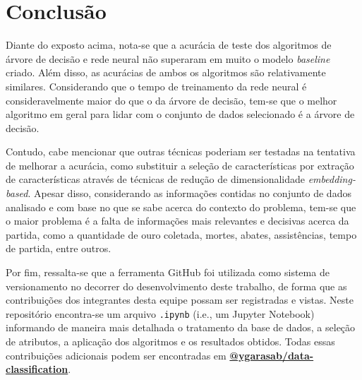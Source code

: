\documentclass[12pt]{article}
\begin{document}
\section{Conclusão}\label{sec:conclusao}
Diante do exposto acima, nota-se que a acurácia de teste dos algoritmos de árvore de decisão e rede neural não superaram em muito o modelo \textit{baseline} criado. Além disso, as acurácias de ambos os algoritmos são relativamente similares.  Considerando que o tempo de treinamento da rede neural é consideravelmente maior do que o da árvore de decisão, tem-se que o melhor algoritmo em geral para lidar com o conjunto de dados selecionado é a árvore de decisão. 

Contudo, cabe mencionar que outras técnicas poderiam ser testadas na tentativa de melhorar a acurácia, como substituir a seleção de características por extração de características através de técnicas de redução de dimensionalidade \textit{embedding-based}. Apesar disso, considerando as informações contidas no conjunto de dados analisado e com base no que se sabe acerca do contexto do problema, tem-se que o maior problema é a falta de informações mais relevantes e decisivas acerca da partida, como a quantidade de ouro coletada, mortes, abates, assistências, tempo de partida, entre outros. 

Por fim, ressalta-se que a ferramenta GitHub foi utilizada como sistema de versionamento no decorrer do desenvolvimento deste trabalho, de forma que as contribuições dos integrantes desta equipe possam ser registradas e vistas. Neste repositório encontra-se um arquivo \texttt{.ipynb} (i.e., um Jupyter Notebook) informando de maneira mais detalhada o tratamento da base de dados, a seleção de atributos, a aplicação dos algoritmos e os resultados obtidos. Todas essas contribuições adicionais podem ser encontradas em \textbf{\href{https://github.com/ygarasab/data-classification}{@ygarasab/data-classification}}.




\end{document}
